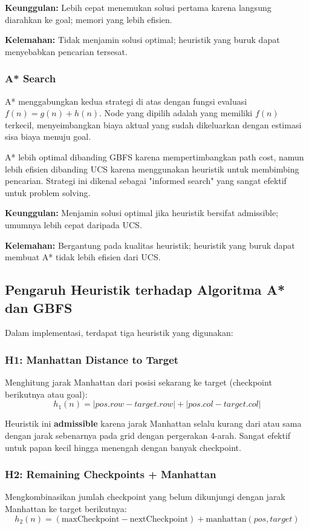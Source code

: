 \textbf{Keunggulan:} Lebih cepat menemukan solusi pertama karena langsung diarahkan ke goal; memori yang lebih efisien.

\textbf{Kelemahan:} Tidak menjamin solusi optimal; heuristik yang buruk dapat menyebabkan pencarian tersesat.

\subsubsection{A* Search}

A* menggabungkan kedua strategi di atas dengan fungsi evaluasi $f(n) = g(n) + h(n)$. Node yang dipilih adalah yang memiliki $f(n)$ terkecil, menyeimbangkan biaya aktual yang sudah dikeluarkan dengan estimasi sisa biaya menuju goal.

A* lebih optimal dibanding GBFS karena mempertimbangkan path cost, namun lebih efisien dibanding UCS karena menggunakan heuristik untuk membimbing pencarian. Strategi ini dikenal sebagai "informed search" yang sangat efektif untuk problem solving.

\textbf{Keunggulan:} Menjamin solusi optimal jika heuristik bersifat admissible; umumnya lebih cepat daripada UCS.

\textbf{Kelemahan:} Bergantung pada kualitas heuristik; heuristik yang buruk dapat membuat A* tidak lebih efisien dari UCS.

\subsection{Pengaruh Heuristik terhadap Algoritma A* dan GBFS}

Dalam implementasi, terdapat tiga heuristik yang digunakan:

\subsubsection{H1: Manhattan Distance to Target}
Menghitung jarak Manhattan dari posisi sekarang ke target (checkpoint berikutnya atau goal):
$$h_1(n) = |pos.row - target.row| + |pos.col - target.col|$$

Heuristik ini \textbf{admissible} karena jarak Manhattan selalu kurang dari atau sama dengan jarak sebenarnya pada grid dengan pergerakan 4-arah. Sangat efektif untuk papan kecil hingga menengah dengan banyak checkpoint.

\subsubsection{H2: Remaining Checkpoints + Manhattan}
Mengkombinasikan jumlah checkpoint yang belum dikunjungi dengan jarak Manhattan ke target berikutnya:
$$h_2(n) = (\text{maxCheckpoint} - \text{nextCheckpoint}) + \text{manhattan}(pos, target)$$

